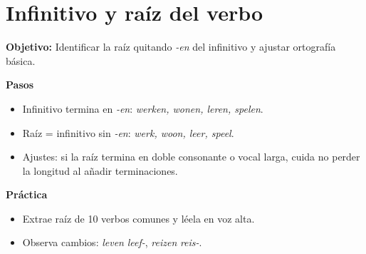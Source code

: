 \section{Infinitivo y raíz del verbo}
\textbf{Objetivo:} Identificar la raíz quitando \textit{-en} del infinitivo y ajustar ortografía básica.

\textbf{Pasos}
\begin{itemize}[leftmargin=*]
  \item Infinitivo termina en \textit{-en}: \textit{werken, wonen, leren, spelen}.
  \item Raíz = infinitivo sin \textit{-en}: \textit{werk, woon, leer, speel}.
  \item Ajustes: si la raíz termina en doble consonante o vocal larga, cuida no perder la longitud al añadir terminaciones.
\end{itemize}

\textbf{Práctica}
\begin{itemize}[leftmargin=*]
  \item Extrae raíz de 10 verbos comunes y léela en voz alta.
  \item Observa cambios: \textit{leven} \textrightarrow{} \textit{leef-}, \textit{reizen} \textrightarrow{} \textit{reis-}.
\end{itemize}
